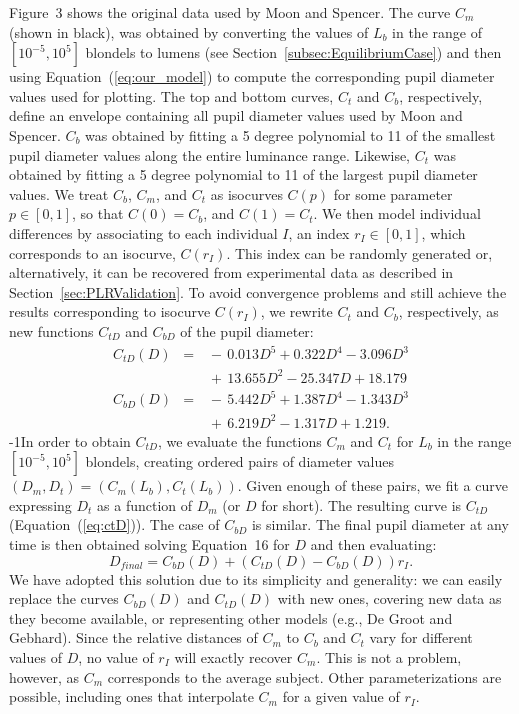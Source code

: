 \documentclass{acmtog}
\begin{document}
Figure~3 shows the original data used by Moon and Spencer. The curve
$C_m$ (shown in black), was obtained by converting the values of $L_b$ in the range of $[10^{-5}, 10^{5}]$ blondels to
lumens (see Section~\ref{subsec:EquilibriumCase}) and then using Equation~(\ref{eq:our_model}) to compute the
corresponding pupil diameter values used for plotting. The top and bottom curves, $C_t$ and $C_b$, respectively, define an
envelope containing all pupil diameter values used by Moon and Spencer. 
$C_b$ was obtained by fitting a 5 degree polynomial to 11 of the smallest pupil diameter values along the entire luminance range. Likewise, $C_t$ was obtained by fitting a 5 degree polynomial to 11 of the largest pupil diameter values. We treat $C_b$,
$C_m$, and $C_t$ as isocurves $C(p)$ for some parameter $p \in [0,1]$, so that $C(0) = C_b$, and $C(1) = C_t$. We then
model individual differences by associating to each individual $I$, an index $r_I \in [0,1]$, which corresponds to an
isocurve, $C(r_I)$.  This index can be randomly generated or, alternatively, it can be recovered from experimental data as
described in Section~\ref{sec:PLRValidation}. To avoid convergence problems and still achieve the results corresponding to
isocurve $C(r_I)$, we rewrite $C_t$ and $C_b$, respectively, as new functions $C_{tD}$ and $C_{bD}$ of the pupil diameter:
\begin{eqnarray}
\label{eq:ctD}
  C_{tD}(D) &=& \,{-}\,0.013 D^5  +  0.322 D^4 - 3.096 D^3\nonumber\\  
              &&\,{+}\,13.655 D^2 - 25.347 D + 18.179\\
\label{eq:cbD}
  C_{bD}(D) &=& \,{-}\,5.442 D^5 + 1.387 D^4 - 1.343 D^3\nonumber\\    
              &&\,{+}\,6.219 D^2 - 1.317 D   + 1.219. 
\end{eqnarray}
%
\looseness-1In order to obtain $C_{tD}$, we evaluate the functions $C_m$ and $C_t$ for $L_b$ in the range $[10^{-5}, 10^5]$ blondels,
creating ordered pairs of diameter values $(D_m, D_t) = (C_m(L_b), C_t(L_b))$. Given enough of these pairs, we fit a curve
expressing $D_t$ as a function of $D_m$ (or $D$ for short). The resulting curve is $C_{tD}$ (Equation~(\ref{eq:ctD})). The
case of $C_{bD}$ is similar. The final pupil diameter at any time is then obtained solving
Equation~16 for $D$ and then evaluating: 
\begin{equation}
\label{eq:isocurve}
D_{final} = C_{bD}(D) + (C_{tD}(D) - C_{bD}(D)) r_I.
\end{equation}
We have adopted this solution due to its simplicity and generality: we can easily replace the curves $C_{bD}(D)$ and $C_{tD}(D)$ with new ones, covering new data as they become available, or representing other models
(e.g., De Groot and Gebhard). Since the relative distances of $C_m$ to $C_b$ and $C_t$ vary for
different values of $D$, no value of $r_I$ will exactly recover $C_m$. This is not a problem, however, as $C_m$
corresponds to the average subject. Other parameterizations are possible, including ones that interpolate $C_m$ for a
given value of $r_I$.  
\end{document}
